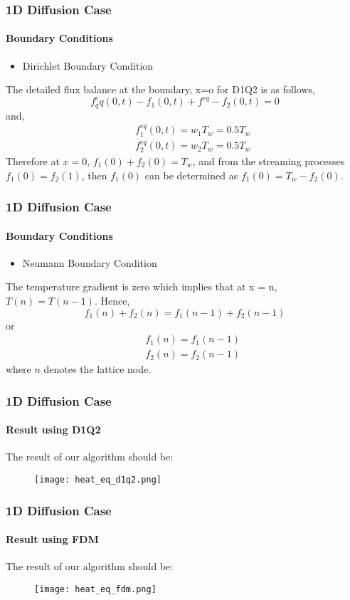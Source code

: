\documentclass[12pt]{beamer}
\begin{document}
\begin{frame}
  \frametitle{1D Diffusion Case}
  \framesubtitle{Boundary Conditions}
  \begin{itemize}
     \item Dirichlet Boundary Condition
    \end{itemize}
  The detailed flux balance at the boundary, x=o for D1Q2 is as follows,
  \begin{equation} \nonumber
   f_q^eq(0,t)-f_1(0,t)+f^{eq}-f_2(0,t)=0
  \end{equation}
  and,
  \begin{eqnarray} \nonumber
    && f_1^{eq}(0,t)=w_1 T_w = 0.5T_w \\
    && f_2^{eq}(0,t)=w_2 T_w = 0.5T_w
  \end{eqnarray}
  Therefore at $x=0$, $f_1(0)+f_2(0) = T_w$, and from the streaming processes 
  $f_1(0)=f_2(1)$, then $f_1(0)$ can be determined as $f_1(0)=T_w-f_2(0)$.
\end{frame}


\begin{frame}
  \frametitle{1D Diffusion Case}
  \framesubtitle{Boundary Conditions}
    \begin{itemize}
     \item Neumann Boundary Condition
    \end{itemize}
  The temperature gradient is zero which implies that at x = n, $T(n)= T(n-1)$.
  Hence,
  \begin{equation} \nonumber
    f_1(n)+f_2(n)=f_1(n-1)+f_2(n-1)
  \end{equation}
  or 
  \begin{eqnarray} 
    && f_1(n)=f_1(n-1) \nonumber \\
    && f_2(n)=f_2(n-1) \nonumber
  \end{eqnarray}
  where $n$ denotes the lattice node.
\end{frame}

\begin{frame}
  \frametitle{1D Diffusion Case}
  \framesubtitle{Result using D1Q2}
  The result of our algorithm should be:
  \begin{figure}
    \centering
    \texttt{[image: heat\_eq\_d1q2.png]}
  \end{figure}
\end{frame}

\begin{frame}
  \frametitle{1D Diffusion Case}
  \framesubtitle{Result using FDM}
  The result of our algorithm should be:
  \begin{figure}
    \centering
    \texttt{[image: heat\_eq\_fdm.png]}
  \end{figure}
\end{frame}
\end{document}
